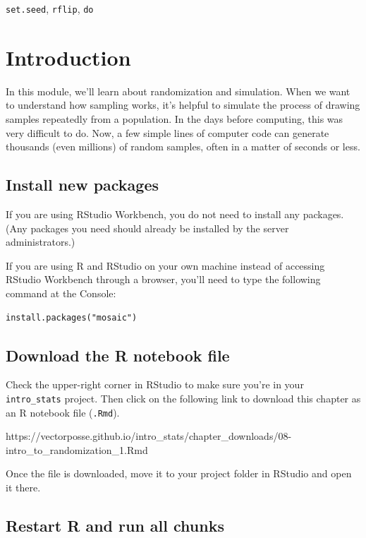 \documentclass[
]{book}
\begin{document}
\texttt{set.seed}, \texttt{rflip}, \texttt{do}

\hypertarget{randomization1-intro}{%
\section{Introduction}\label{randomization1-intro}}

In this module, we'll learn about randomization and simulation. When we want to understand how sampling works, it's helpful to simulate the process of drawing samples repeatedly from a population. In the days before computing, this was very difficult to do. Now, a few simple lines of computer code can generate thousands (even millions) of random samples, often in a matter of seconds or less.

\hypertarget{randomization1-install}{%
\subsection{Install new packages}\label{randomization1-install}}

If you are using RStudio Workbench, you do not need to install any packages. (Any packages you need should already be installed by the server administrators.)

If you are using R and RStudio on your own machine instead of accessing RStudio Workbench through a browser, you'll need to type the following command at the Console:

\begin{verbatim}
install.packages("mosaic")
\end{verbatim}

\hypertarget{randomization1-download}{%
\subsection{Download the R notebook file}\label{randomization1-download}}

Check the upper-right corner in RStudio to make sure you're in your \texttt{intro\_stats} project. Then click on the following link to download this chapter as an R notebook file (\texttt{.Rmd}).

https://vectorposse.github.io/intro\_stats/chapter\_downloads/08-intro\_to\_randomization\_1.Rmd

Once the file is downloaded, move it to your project folder in RStudio and open it there.

\hypertarget{randomization1-restart}{%
\subsection{Restart R and run all chunks}\label{randomization1-restart}}
\end{document}
